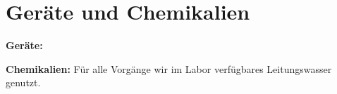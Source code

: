 \section{Geräte und Chemikalien}
\label{sec:geraete}

\textbf{Geräte:}


\textbf{Chemikalien:}
Für alle Vorgänge wir im Labor verfügbares Leitungswasser genutzt.